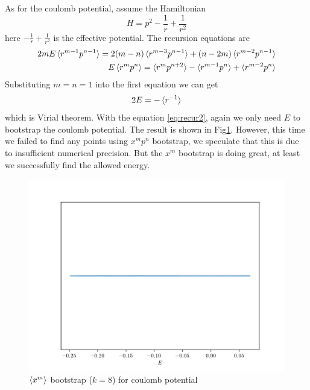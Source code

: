\documentclass[aps, preprint,amsmath, amssymb]{revtex4-2}
\begin{document}
As for the coulomb potential, assume the Hamiltonian
\begin{equation}
    H = p^2 - \frac1r + \frac1{r^2}
\end{equation}
here $- \frac1r + \frac1{r^2}$ is the effective potential. The recursion equations are
\begin{align}
    2mE\braket{r^{m - 1} p^{n - 1}} = 2(m - n)\braket{r^{m - 3} p^{n - 1}} + (n - 2m)\braket{r^{m - 2} p^{n - 1}} \notag \\
    E\braket{r^m p^n} = \braket{r^m p^{n + 2}} - \braket{r^{m - 1} p^n} + \braket{r^{m - 2} p^n}
\end{align}
Substituting $m = n = 1$ into the first equation we can get
\begin{equation}
    2E = -\braket{r^{-1}}
\end{equation}
which is Virial theorem. With the equation \eqref{eq:recur2}, again we only need $E$ to bootstrap the coulomb potential. The result is shown in Fig\ref{fig:coulomb}. However, this time we failed to find any points using $x^m p^n$ bootstrap, we speculate that this is due to insufficient numerical precision. But the $x^m$ bootstrap is doing great, at least we successfully find the allowed energy.
\begin{figure}
    \includegraphics[width=0.8\linewidth]{coulomb.png}
    \caption{$\braket{x^m}$ bootstrap ($k = 8$) for coulomb potential}
    \label{fig:coulomb}
\end{figure}
\end{document}
